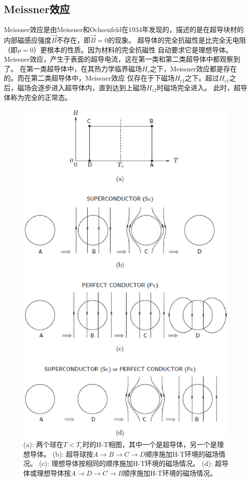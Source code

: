 \subsection{Meissner效应}
Meissner效应是由Meissner和Ochsenfeld在1934年发现的，描述的是在超导块材的内部磁感应强度$\vec{B}$不存在，即$\vec{B}=0$的现象。
超导体的完全抗磁性是比完全无电阻（即$\rho=0$）更根本的性质。因为材料的完全抗磁性
自动要求它是理想导体。Meissner效应，产生于表面的超导电流，这在第一类和第二类超导体中都观察到了。
在第一类超导体中，在其热力学临界磁场$H_c$之下，Meissner效应都是存在的。而在第二类超导体中，Meissner效应
仅存在于下磁场$H_{c1}$之下。超过$H_{c1}$之后，磁场会逐步进入超导体内，直到达到上磁场$H_{c2}$时磁场完全进入。
此时，超导体称为完全的正常态。
\begin{figure}
  \centering
 \includegraphics[scale=0.7]{chpt1/figs/fig1.1.eps}
  \caption{
(a): 两个球在$T <T_c$时的H-T相图，其中一个是超导体，另一个是理想导体。
(b): 超导球按$ A\rightarrow B\rightarrow C\rightarrow D$顺序施加H-T环境的磁场情况。
(c): 理想导体按相同的顺序施加H-T环境的磁场情况。
(d): 超导体或理想导体按$A\rightarrow D\rightarrow C\rightarrow B$顺序施加H-T环境的磁场情况。}
\end{figure}

